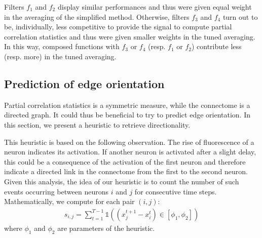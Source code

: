 \documentclass[wcp]{jmlr}
\begin{document}
Filters $f_1$ and $f_2$ display similar performances and thus were given equal weight in the averaging of the simplified method.
Otherwise, filters $f_3$ and $f_4$ turn out to be, individually, less competitive to provide the signal to compute partial correlation statistics and thus were given smaller weights in the tuned averaging.
In this way, composed functions with $f_3$ or $f_4$ (resp. $f_1$ or $f_2$) contribute less (resp. more) in the tuned averaging. 





\subsection{Prediction of edge orientation}
\label{sapp:connectome}

Partial correlation statistics is a symmetric measure, while the connectome is
a directed graph. It could thus be beneficial to try to predict edge orientation. In
this section, we present a heuristic to retrieve directionality. %

This heuristic is based on the following observation. The rise of fluorescence
of a neuron indicates its activation. If another neuron is activated after a
slight delay, this could be a consequence of the activation of the first neuron
and therefore indicate a directed link in the connectome from the first to the
second neuron. Given this analysis, the idea of our heuristic is to count the
number of such events occurring between neurons $i$ and $j$ for consecutive
time steps. Mathematically, we compute for each pair $(i,j)$:
\begin{align}
s_{i,j} = \sum_{t=1}^{T - 1} \mathbb{1}((x_j^{t+1} - x_i^t) \in \left[\phi_1, \phi_2\right])
\end{align}
where $\phi_1$ and $\phi_2$ are parameters of the heuristic.
\end{document}
